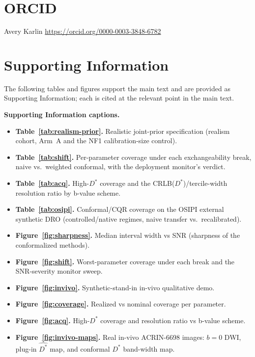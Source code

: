 \documentclass[11pt]{article}
\newcommand{\Dstar}{D^{*}}
\begin{document}
\section*{ORCID}
Avery Karlin \quad \href{https://orcid.org/0000-0003-3848-6782}{https://orcid.org/0000-0003-3848-6782}




\clearpage
\renewcommand{\thefigure}{S\arabic{figure}}
\renewcommand{\thetable}{S\arabic{table}}
\setcounter{figure}{0}
\setcounter{table}{0}
\section*{Supporting Information}
\noindent The following tables and figures support the main text and are provided as
Supporting Information; each is cited at the relevant point in the main text.

\medskip
\noindent\textbf{Supporting Information captions.}
\begin{itemize}\itemsep2pt
\item \textbf{Table~\ref{tab:realism-prior}.} Realistic joint-prior specification
(realism cohort, Arm~A and the NF1 calibration-size control).
\item \textbf{Table~\ref{tab:shift}.} Per-parameter coverage under each
exchangeability break, naive vs.\ weighted conformal, with the deployment monitor's
verdict.
\item \textbf{Table~\ref{tab:acq}.} High-$\Dstar$ coverage and the
CRLB($\Dstar$)/tercile-width resolution ratio by b-value scheme.
\item \textbf{Table~\ref{tab:osipi}.} Conformal/CQR coverage on the OSIPI external
synthetic DRO (controlled/native regimes, naive transfer vs.\ recalibrated).
\item \textbf{Figure~\ref{fig:sharpness}.} Median interval width vs SNR (sharpness of
the conformalized methods).
\item \textbf{Figure~\ref{fig:shift}.} Worst-parameter coverage under each break and
the SNR-severity monitor sweep.
\item \textbf{Figure~\ref{fig:invivo}.} Synthetic-stand-in in-vivo qualitative demo.
\item \textbf{Figure~\ref{fig:coverage}.} Realized vs nominal coverage per parameter.
\item \textbf{Figure~\ref{fig:acq}.} High-$\Dstar$ coverage and resolution ratio vs
b-value scheme.
\item \textbf{Figure~\ref{fig:invivo-maps}.} Real in-vivo ACRIN-6698 images: $b{=}0$
DWI, plug-in $\hat{\Dstar}$ map, and conformal $\Dstar$ band-width map.
\end{itemize}
\end{document}
